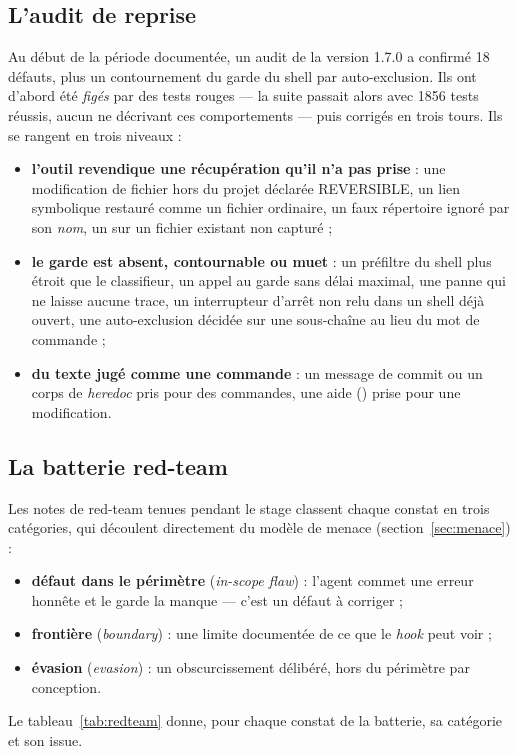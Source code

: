 \subsection{L'audit de reprise}
Au début de la période documentée, un audit de la version 1.7.0 a confirmé 18 défauts, plus un
contournement du garde du shell par auto-exclusion. Ils ont d'abord été \emph{figés} par des
tests rouges --- la suite passait alors avec 1856 tests réussis, aucun ne décrivant ces
comportements --- puis corrigés en trois tours. Ils se rangent en trois niveaux :
\begin{itemize}
  \item \textbf{l'outil revendique une récupération qu'il n'a pas prise} : une modification de
    fichier hors du projet déclarée REVERSIBLE, un lien symbolique restauré comme un fichier
    ordinaire, un faux répertoire  ignoré par son \emph{nom}, un
     sur un fichier existant non capturé ;
  \item \textbf{le garde est absent, contournable ou muet} : un préfiltre du shell plus étroit
    que le classifieur, un appel au garde sans délai maximal, une panne qui ne laisse aucune
    trace, un interrupteur d'arrêt non relu dans un shell déjà ouvert, une auto-exclusion
    décidée sur une sous-chaîne au lieu du mot de commande ;
  \item \textbf{du texte jugé comme une commande} : un message de commit ou un corps de
    \textit{heredoc} pris pour des commandes, une aide () prise pour une
    modification.
\end{itemize}

\subsection{La batterie red-team}
Les notes de red-team tenues pendant le stage classent chaque constat en trois catégories, qui
découlent directement du modèle de menace (section~\ref{sec:menace}) :
\begin{itemize}
  \item \textbf{défaut dans le périmètre} (\textit{in-scope flaw}) : l'agent commet une erreur
    honnête et le garde la manque --- c'est un défaut à corriger ;
  \item \textbf{frontière} (\textit{boundary}) : une limite documentée de ce que le \textit{hook}
    peut voir ;
  \item \textbf{évasion} (\textit{evasion}) : un obscurcissement délibéré, hors du périmètre par
    conception.
\end{itemize}
Le tableau~\ref{tab:redteam} donne, pour chaque constat de la batterie, sa catégorie et son
issue.

